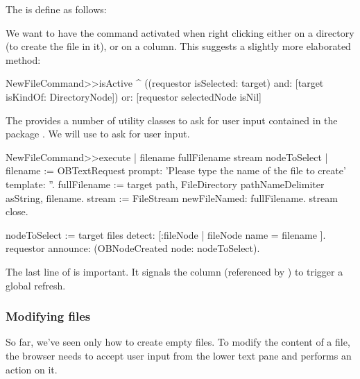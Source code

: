 \documentclass[a4paper,10pt,twoside]{book}
\begin{document}
The  is define as follows:


We want to have the command activated when right clicking either on a directory (to create the file in it), or on a column. This suggests a slightly more elaborated  method:

\begin{code}{}    
NewFileCommand>>isActive
	^ ((requestor isSelected: target) and: [target isKindOf: DirectoryNode])
			or: [requestor selectedNode isNil]
\end{code}

The \obf provides a number of utility classes to ask for user input contained in the package . We will use  to ask for user input. 

\begin{code}{}    
NewFileCommand>>execute
	| filename fullFilename stream nodeToSelect |
	filename := OBTextRequest 
					prompt: 'Please type the name of the file to create' 
					template: ''.
	fullFilename := target path, FileDirectory pathNameDelimiter asString, filename.
	stream := FileStream newFileNamed: fullFilename.
	stream close.

	nodeToSelect := target files detect: [:fileNode | fileNode name = filename ].
	requestor announce: (OBNodeCreated node: nodeToSelect).
\end{code}

The last line of  is important. It signals the column (referenced by ) to trigger a global refresh. 


\subsubsection{Modifying files}

So far, we've seen only how to create empty files. To modify the content of a file, the browser needs to accept user input from the lower text pane and performs an action on it. 
\end{document}
